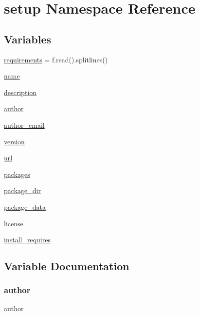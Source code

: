 \hypertarget{namespacesetup}{}\section{setup Namespace Reference}
\label{namespacesetup}
\subsection*{Variables}
\begin{DoxyCompactItemize}
\item 
\hyperlink{namespacesetup_aae5f59f06402b79899f58170ca7c3abb}{requirements} = f.\+read().splitlines()
\item 
\hyperlink{namespacesetup_ab74e6bf80237ddc4109968cedc58c151}{name}
\item 
\hyperlink{namespacesetup_a2661f439a4a94ffdcd5e47ae1da0bb1d}{description}
\item 
\hyperlink{namespacesetup_ad50afb6ec7b2501164b80a0480596ded}{author}
\item 
\hyperlink{namespacesetup_aa0684bedaf8c5c409060306e443a7742}{author\+\_\+email}
\item 
\hyperlink{namespacesetup_a4c7a521b8f1a0769c09bfa4a1fca7dab}{version}
\item 
\hyperlink{namespacesetup_afcd5a3e84f2adb7f83fa6c99911f31e4}{url}
\item 
\hyperlink{namespacesetup_a5191bfd75a28371588f75471591d5500}{packages}
\item 
\hyperlink{namespacesetup_a831b74f0aec5de1cb7b526c3de2c12ed}{package\+\_\+dir}
\item 
\hyperlink{namespacesetup_a3082807deecba7a5edc23253ddfb584f}{package\+\_\+data}
\item 
\hyperlink{namespacesetup_a4e659be027e258b72df12349200a263e}{license}
\item 
\hyperlink{namespacesetup_a047d4e9f7b152e767f7bd459218fe1fd}{install\+\_\+requires}
\end{DoxyCompactItemize}


\subsection{Variable Documentation}
\mbox{\label{namespacesetup_ad50afb6ec7b2501164b80a0480596ded}} 
\subsubsection{\texorpdfstring{author}{author}}
{\footnotesize\ttfamily author}

